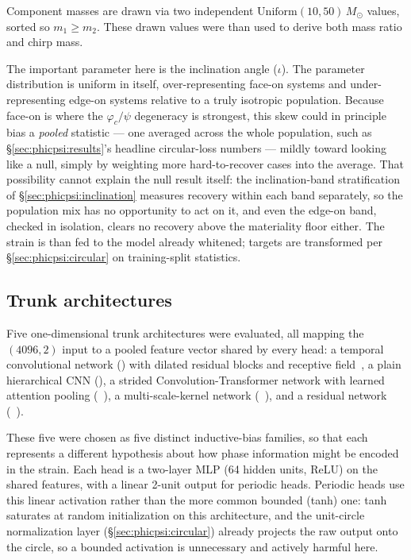 Component masses are drawn via two independent $\mathrm{Uniform}(10,50)\,M_\odot$ values, sorted so $m_1\geq m_2$.
These drawn values were than used to derive both mass ratio and chirp mass.

The important parameter here is the inclination angle ($\iota$).
The parameter distribution is uniform in itself, over-representing face-on systems and under-representing edge-on systems relative to a truly isotropic population.
Because face-on is where the $\varphi_c/\psi$ degeneracy is strongest, this skew could in principle bias a \emph{pooled} statistic --- one averaged across the whole population, such as \S\ref{sec:phicpsi:results}'s headline circular-loss numbers --- mildly toward looking like a null, simply by weighting more hard-to-recover cases into the average.
That possibility cannot explain the null result itself: the inclination-band stratification of \S\ref{sec:phicpsi:inclination} measures recovery within each band separately, so the population mix has no opportunity to act on it, and even the edge-on band, checked in isolation, clears no recovery above the materiality floor either.
The strain is than fed to the model already whitened; targets are transformed per \S\ref{sec:phicpsi:circular} on training-split statistics.

\subsection{Trunk architectures}
\label{sec:phicpsi:trunks}

Five one-dimensional trunk architectures were evaluated, all mapping the $(4096,2)$ input to a pooled feature vector shared by every head: a temporal convolutional network (\Tcn) with dilated residual blocks and receptive field~\citep{bai2018tcn}, a plain hierarchical CNN (\cnnBaseline), a strided Convolution-Transformer network with learned attention pooling (\cnnAttn~\citep{vaswani2017attention}), a multi-scale-kernel network (\inceptionTime~\citep{fawaz2019inceptiontime}), and a residual network (\resnetOneD~\citep{he2016resnet}).

These five were chosen as five distinct inductive-bias families, so that each represents a different hypothesis about how phase information might be encoded in the strain.
Each head is a two-layer MLP (64 hidden units, ReLU) on the shared features, with a linear 2-unit output for periodic heads.
Periodic heads use this linear activation rather than the more common bounded (tanh) one: tanh saturates at random initialization on this architecture, and the unit-circle normalization layer (\S\ref{sec:phicpsi:circular}) already projects the raw output onto the circle, so a bounded activation is unnecessary and actively harmful here.

